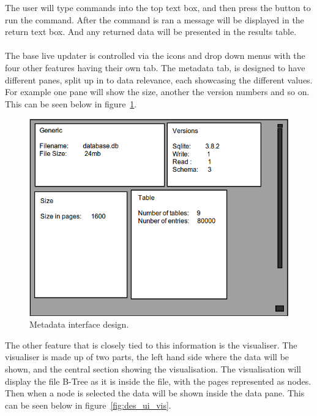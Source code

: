 The user will type commands into the top text box, and then press the button to run the command. After the command is ran a message will be displayed in the return text box. And any returned data will be presented in the results table.
\\\\
The base live updater is controlled via the icons and drop down menus with the four other features having their own tab. The metadata tab, is designed to have different panes, split up in to data relevance, each showcasing the different values. For example one pane will show the size, another the version numbers and so on. This can be seen below in figure~\ref{fig:des_ui_meta}. 

\begin{figure}[H]
	\centering
	\includegraphics[scale=0.32]{images/ui_meatadata.png}
	\caption{Metadata interface design.}
	\label{fig:des_ui_meta}
\end{figure}

The other feature that is closely tied to this information is the visualiser. The visualiser is made up of two parts, the left hand side where the data will be shown, and the central section showing the visualisation. The visualisation will display the file B-Tree as it is inside the file, with the pages represented as nodes. Then when a node is selected the data will be shown inside the data pane. This can be seen below in figure~\ref{fig:des_ui_vis}.

